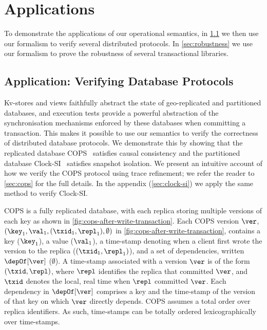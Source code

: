 \section{Applications}
\label{sec:applications}
\label{sec:program-analysis}

To demonstrate the applications of our operational semantics, 
in \cref{sec:verify-impl} we then use our formalism to verify several distributed protocols.
In \cref{sec:robustness} we use our formalism to prove the robustness of several transactional libraries.

\subsection{Application: Verifying Database Protocols}
\label{sec:verify-impl}
Kv-stores and views faithfully abstract the state of geo-replicated and partitioned
databases, and  execution tests provide a powerful abstraction of the synchronisation mechanisms  enforced by these databases when committing a transaction. This makes it
possible to use our 
semantics to verify the correctness of distributed database protocols. 
We  demonstrate this by showing that the replicated database 
COPS~\cite{cops} satisfies causal consistency and
the partitioned database Clock-SI~\cite{clocksi} satisfies snapshot isolation.
We present an intuitive account of how we verify the COPS protocol using trace refinement;
we refer the reader to \cref{sec:cops} for the full details.
In the appendix (\cref{sec:clock-si}) we apply the same method to verify Clock-SI.



COPS is a fully replicated database, with each replica storing multiple versions of each key as shown in \cref{fig:cops-after-write-transaction}. 
Each COPS version \( \ver \),
\eg \( (\key_1,\val_1,(\txid_1,\repl_1), \emptyset) \) in \cref{fig:cops-after-write-transaction},
contains a key (\eg $\key_1$), a value (\eg $\val_1$), a time-stamp denoting when a client first wrote the version to the replica (\eg $(\txid_1, \repl_1)$), and a set of dependencies, written $\depOf[\ver]$ (\eg $\emptyset$). 
A time-stamp associated with a version $\ver$ is of the form $(\txid, \repl)$, where $\repl$ identifies the replica that committed $\ver$, and $\txid$ denotes the local, real time when $\repl$ committed $\ver$. 
Each dependency in $\depOf[\ver]$ comprises a key and the time-stamp of the version of that key on which $\ver$ directly depends.  
COPS assumes a total order over replica identifiers. As such, time-stamps can be
totally ordered lexicographically over time-stamps. 

